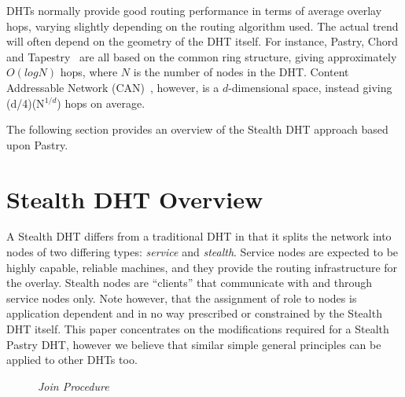 \documentclass[letterpaper]{sig-alternate} %
\begin{document}
DHTs normally provide good routing performance in terms of average overlay
hops, varying slightly depending on the routing algorithm used. The actual
trend will often depend on the geometry of the DHT itself. For instance,
Pastry, Chord and Tapestry~\cite{rowstron01pastry, chord01, tapestry01} are all
based on the common ring structure, giving approximately $O(log N)$ hops, where
$N$ is the number of nodes in the DHT. Content Addressable Network
(CAN)~\cite{can01}, however, is a $d$-dimensional space, instead giving
(d/4)(N$^{1/d}$) hops on average.

The following section provides an overview of the Stealth DHT approach
based upon Pastry.


\section{Stealth DHT Overview}
\label{sect-stealth}

A Stealth DHT differs from a traditional DHT in that it splits the
network into nodes of two differing types: \emph{service} and
\emph{stealth}. Service nodes are expected to be highly capable,
reliable machines, and they provide the routing infrastructure for
the overlay. Stealth nodes are ``clients'' that communicate with and
through service nodes only. Note however, that the assignment of
role to nodes is application dependent and in no way prescribed or
constrained by the Stealth DHT itself.  This paper concentrates on
the modifications required for a Stealth Pastry DHT, however we
believe that similar simple general principles can be applied to
other DHTs too.

\begin{figure}[tb]\centering
{}
\caption{\em Join Procedure}
\label{fig:join_procedure}
\end{figure}
\end{document}
